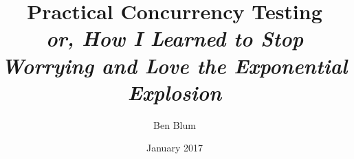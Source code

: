 \documentclass[12pt]{cmuthesis}
\begin{document}
\frontmatter

\pagestyle{empty}

\title{ %
{\bf Practical Concurrency Testing} \\
\normalsize \vspace{1em}
{\em or, How I Learned to Stop Worrying and Love the Exponential Explosion}}
\author{Ben Blum}
\date{January 2017}
\trnumber{}


\support{}
\disclaimer{}



\maketitle


\pagestyle{plain} %

\end{document}
